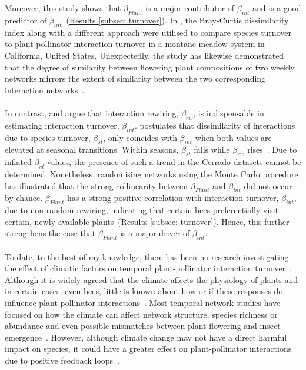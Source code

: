 \documentclass[11pt]{article}
\begin{document}
\\
\\
Moreover, this study shows that $\beta_{Plant}$ is a major contributor of $\beta_{int}$ and is a good predictor of $\beta_{int}$~(\hyperref[subsec: turnover]{Results \ref{subsec: turnover}}). In \cite{Alarcon2008}, the Bray-Curtis dissimilarity index along with a different approach were utilised to compare species turnover to plant-pollinator interaction turnover in a montane meadow system in California, United States. Unexpectedly, the study has likewise demonstrated that the degree of similarity between flowering plant compositions of two weekly networks mirrors the extent of similarity between the two corresponding interaction networks~\citep{Alarcon2008}. \\
\\
In contrast, \cite{Poisot2015} and \cite{CaraDonna2017} argue that interaction rewiring, $\beta_{rw}$, is indispensable in estimating interaction turnover, $\beta_{int}$. \cite{CaraDonna2017} postulates that dissimilarity of interactions due to species turnover, $\beta_{st}$, only coincides with $\beta_{int}$ when both values are elevated at seasonal transitions. Within seasons, $\beta_{st}$ falls while $\beta_{rw}$ rises~\citep{CaraDonna2017}. Due to inflated $\beta_{st}$ values, the presence of such a trend in the Cerrado datasets cannot be determined. Nonetheless, randomising networks using the Monte Carlo procedure has illustrated that the strong collinearity between $\beta_{Plant}$ and $\beta_{int}$ did not occur by chance. $\beta_{Plant}$ has a strong positive correlation with interaction turnover, $\beta_{int}$, due to non-random rewiring, indicating that certain bees preferentially visit certain, newly-available plants~(\hyperref[subsec: turnover]{Results \ref{subsec: turnover}}). Hence, this further strengthens the case that $\beta_{Plant}$ is a major driver of $\beta_{int}$.\\
\\
To date, to the best of my knowledge, there has been no research investigating the effect of climatic factors on temporal plant-pollinator interaction turnover~\citep{Burkle2011, Scaven2013}. Although it is widely agreed that the climate affects the physiology of plants and in certain cases, even bees, little is known about how or if these responses do influence plant-pollinator interactions~\citep{Hughes2000, Parmesan2003}. Most temporal network studies have focused on how the climate can affect network structure, species richness or abundance and even possible mismatches between plant flowering and insect emergence~\citep{BASILIO2006, Alarcon2008, MartinGonzalez2009, Schweiger2010}. However, although climate change may not have a direct harmful impact on species, it could have a greater effect on plant-pollinator interactions due to positive feedback loops~\citep{Hegland2009, Scaven2013}. \\
\end{document}
